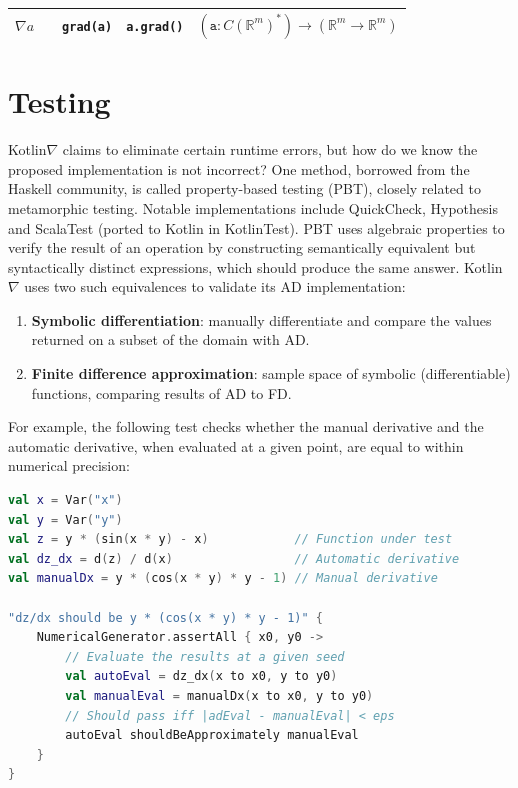 \documentclass[12pt,initial,twoside,maitrise]{dms}
\numberwithin{equation}{section}
\numberwithin{table}{chapter}
\numberwithin{figure}{chapter}
\begin{document}
{\begin{table}
\begin{tabular}{|c|c|c|c|l|}
               $\nabla a$                                     &                                                                                &  \texttt{grad(a)}                                                                       & \texttt{a.grad()}                                                                          & $                   (\texttt{a}: C(\mathbb{R}^{m})^{*}) \rightarrow (\mathbb{R}^{m}\rightarrow\mathbb{R}^{m})                                                                         $ \\ \hline
    \end{tabular}
\end{table}
}

\section{Testing}

Kotlin$\nabla$ claims to eliminate certain runtime errors, but how do we know the proposed implementation is not incorrect? One method, borrowed from the Haskell community, is called property-based testing (PBT), closely related to metamorphic testing. Notable implementations include QuickCheck, Hypothesis and ScalaTest (ported to Kotlin in KotlinTest). PBT uses algebraic properties to verify the result of an operation by constructing semantically equivalent but syntactically distinct expressions, which should produce the same answer. Kotlin$\nabla$ uses two such equivalences to validate its AD implementation:

\begin{enumerate}
    \item \textbf{Symbolic differentiation}: manually differentiate and compare the values returned on a subset of the domain with AD.
    \item \textbf{Finite difference approximation}: sample space of symbolic (differentiable) functions, comparing results of AD to FD.
\end{enumerate}

\noindent For example, the following test checks whether the manual derivative and the automatic derivative, when evaluated at a given point, are equal to within numerical precision:

\begin{lstlisting}[language=Kotlin, showstringspaces=false]
val x = Var("x")
val y = Var("y")
val z = y * (sin(x * y) - x)            // Function under test
val dz_dx = d(z) / d(x)                 // Automatic derivative
val manualDx = y * (cos(x * y) * y - 1) // Manual derivative

"dz/dx should be y * (cos(x * y) * y - 1)" {
    NumericalGenerator.assertAll { x0, y0 ->
        // Evaluate the results at a given seed
        val autoEval = dz_dx(x to x0, y to y0)
        val manualEval = manualDx(x to x0, y to y0)
        // Should pass iff |adEval - manualEval| < eps
        autoEval shouldBeApproximately manualEval
    }
}
\end{lstlisting}
\end{document}

